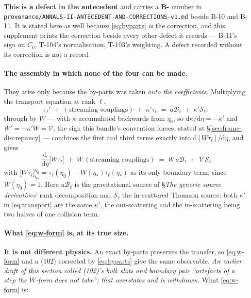 \textbf{This is a defect in the antecedent} and carries a \textbf{B-} number in
\texttt{provenance/ANNALS-II-ANTECEDENT-AND-CORRECTIONS-v1.md} beside B-10 and
B-11. It is stated here as well because \eqref{eq:byparts} \emph{is} the
correction, and this supplement prints the correction beside every other defect
it records --- B-11's sign on $C_0$, T-104's normalisation, T-103's weighting.
A defect recorded without its correction is not a record.

\paragraph{The assembly in which none of the four can be made.} They arise
only because the by-parts was taken \emph{onto the coefficients}. Multiplying
the transport equation at rank $\ell$,
\begin{equation}
  \tau_\ell' \;+\; (\text{streaming couplings}) \;+\; \kappa'\tau_\ell
  \;=\; a\mathcal B_\ell \;+\; \kappa'\mathcal S_\ell ,
  \label{eq:transport}
\end{equation}
through by $W$ --- with $\kappa$ accumulated backwards from $\eta_0$, so
$\mathrm d\kappa/\mathrm d\eta=-\kappa'$ and $W'=+\kappa'W=\mathcal V$, the
sign this bundle's convention forces, stated at
\S\ref{sec:frame-discrepancy} --- combines the first and third terms exactly
into $\mathrm d[W\tau_\ell]/\mathrm d\eta$, and gives
\begin{equation}
  \boxed{\;
  \frac{\mathrm d}{\mathrm d\eta}\big[W\tau_\ell\big]
  \;+\; W\,(\text{streaming couplings})
  \;=\; W\,a\mathcal B_\ell \;+\; \mathcal V\,\mathcal S_\ell \;}
  \label{eq:w-form}
\end{equation}
with $\big[W\tau_\ell\big]_{\eta_*}^{\eta_0}=\tau_\ell(\eta_0)-W(\eta_*)
\tau_\ell(\eta_*)$ as its only boundary term, since $W(\eta_0)=1$. Here
$a\mathcal B_\ell$ is the gravitational source of \S\emph{The generic source
derivatives}' rank decomposition and $\mathcal S_\ell$ the in-scattered Thomson
source; both $\kappa'$ in \eqref{eq:transport} are the same $\kappa'$, the
out-scattering and the in-scattering being two halves of one collision term.

\paragraph{What \eqref{eq:w-form} is, at its true size.} \textbf{It is not
different physics.} An exact by-parts preserves the transfer, so
\eqref{eq:w-form} and a (102) corrected by \eqref{eq:byparts} give the same
observable. \emph{An earlier draft of this section called (102)'s bulk slots
and boundary pair ``artefacts of a step the $W$-form does not take''; that
overstates and is withdrawn.} What \eqref{eq:w-form} is:

